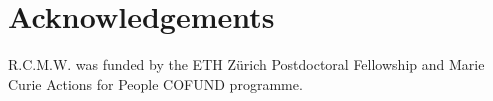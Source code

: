 \documentclass[11pt]{article}
\newcommand{\rw}[1]{{\textcolor{red}{[RW: #1]}}} %
\newcommand{\aw}[1]{{\textcolor{armygreen}{[AW: #1]}}} %
\begin{document}



\section{Acknowledgements}
R.C.M.W. was funded by the ETH Z\"urich Postdoctoral Fellowship and Marie Curie Actions for People COFUND programme.

\clearpage


\end{document}
